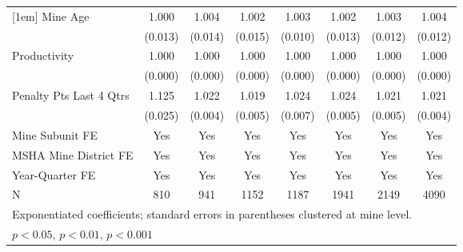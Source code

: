 {\begin{tabular}{l*{7}{c}}
[1em]
Mine Age                 &       1.000         &       1.004         &       1.002         &       1.003         &       1.002         &       1.003         &       1.004         \\
                         &     (0.013)         &     (0.014)         &     (0.015)         &     (0.010)         &     (0.013)         &     (0.012)         &     (0.012)         \\
[1em]
Productivity             &       1.000         &       1.000         &       1.000         &       1.000         &       1.000         &       1.000         &       1.000         \\
                         &     (0.000)         &     (0.000)         &     (0.000)         &     (0.000)         &     (0.000)         &     (0.000)         &     (0.000)         \\
[1em]
Penalty Pts Last 4 Qtrs  &       1.125\sym{***}&       1.022\sym{***}&       1.019\sym{***}&       1.024\sym{***}&       1.024\sym{***}&       1.021\sym{***}&       1.021\sym{***}\\
                         &     (0.025)         &     (0.004)         &     (0.005)         &     (0.007)         &     (0.005)         &     (0.005)         &     (0.004)         \\
[1em]
Mine Subunit FE          &         Yes         &         Yes         &         Yes         &         Yes         &         Yes         &         Yes         &         Yes         \\
[1em]
MSHA Mine District FE    &         Yes         &         Yes         &         Yes         &         Yes         &         Yes         &         Yes         &         Yes         \\
[1em]
Year-Quarter FE          &         Yes         &         Yes         &         Yes         &         Yes         &         Yes         &         Yes         &         Yes         \\
\hline
N                        &         810         &         941         &        1152         &        1187         &        1941         &        2149         &        4090         \\
\hline\hline
\multicolumn{8}{l}{\footnotesize Exponentiated coefficients; standard errors in parentheses clustered at mine level.}\\
\multicolumn{8}{l}{\footnotesize \sym{*} \(p<0.05\), \sym{**} \(p<0.01\), \sym{***} \(p<0.001\)}\\
\end{tabular}
}
